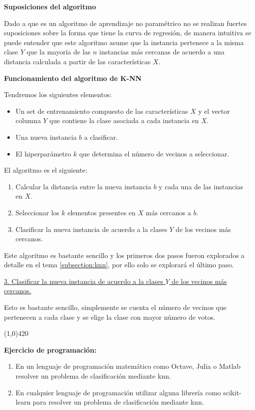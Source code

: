 \documentclass[11pt,fleqn]{book} %
\begin{document}
\textbf{Suposiciones del algoritmo}

Dado a que es un algoritmo de aprendizaje no paramétrico no se realizan fuertes suposiciones sobre la forma que tiene la curva de regresión, de manera intuitiva se puede entender que este algoritmo asume que la instancia pertenece a la misma clase $Y$ que la mayoría de las $n$ instancias más cercanas de acuerdo a una distancia calculada a partir de las características $X$.

\textbf{Funcionamiento del algoritmo de K-NN}

Tendremos los siguientes elementos:

\begin{itemize}
\item  Un set de entrenamiento compuesto de las características $X$ y el vector columna $Y$ que contiene la clase asociada a cada instancia en $X$.
\item Una nueva instancia $b$ a clasificar.
\item El hiperparámetro $k$ que determina el número de vecinos a seleccionar.
\end{itemize}

El algoritmo es el siguiente:
\begin{enumerate}
\item Calcular la distancia entre la nueva instancia $b$ y cada una de las instancias en $X$.
\item Seleccionar los $k$ elementos presentes en $X$ más cercanos a $b$.
\item Clasificar la nueva instancia de acuerdo a la clases $Y$ de los vecinos más cercanos.
\end{enumerate}

Este algoritmo es bastante sencillo y los primeros dos pasos fueron explorados a detalle en el tema \ref{subsection:knn}, por ello solo se explorará el último paso.

\underline{3. Clasificar la nueva instancia de acuerdo a la clases $Y$ de los vecinos más cercanos.}

Esto es bastante sencillo, simplemente se cuenta el número de vecinos que pertenecen a cada clase y se elige la clase con mayor número de votos.

\begin{center}
\line(1,0){420}
\end{center}

\textbf{Ejercicio de programación:}

\begin{enumerate}
\item En un lenguaje de programación matemático como Octave, Julia o Matlab resolver un problema de clasificación mediante knn.
\item En cualquier lenguaje de programación utilizar alguna librería como scikit-learn para resolver un problema de clasificación mediante knn.
\end{enumerate}
\end{document}
